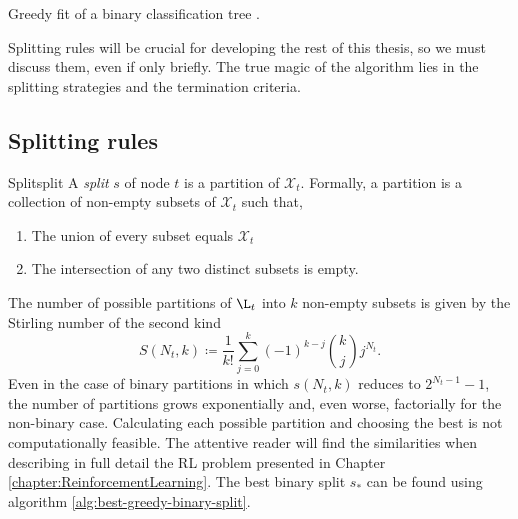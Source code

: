 \begin{algorithm}
    \caption[Greedy tree fitting algorithm]{Greedy fit of a binary
        classification tree \cite[Ch.~3.3]{louppe2014}.}
    \label{alg:tree-fit}
\end{algorithm}

Splitting rules will be crucial for developing the rest of this thesis, so we
must discuss them, even if only briefly. The true magic of the algorithm lies in
the splitting strategies and the termination criteria.

\subsection{Splitting rules}

\begin{dfn}{Split}{split}
    A \emph{split} $s$ of node $t$ is a partition of $\mathcal{X}_t$. Formally, a partition is a collection of non-empty subsets of $\mathcal{X}_t$ such that,
    \begin{enumerate}
        \item The union of every subset equals $\mathcal{X}_t$
        \item The intersection of any two distinct subsets is empty.
    \end{enumerate}
\end{dfn}

The number of possible partitions of $\L_t$ into $k$ non-empty subsets is given
by the Stirling number of the second kind \cite{louppe2014}
\[
    S(N_t, k) \coloneqq \frac{1}{k!} \sum_{j=0}^{k} (-1)^{k-j} \binom{k}{j} j^{N_t}.
\]
Even in the case of binary partitions in which $s(N_t, k)$ reduces to $2^{N_t
-1}-1$, the number of partitions grows exponentially and, even worse,
factorially for the non-binary case. Calculating each possible partition and
choosing the best is not computationally feasible. The attentive reader will
find the similarities when describing in full detail the RL problem presented in
Chapter \ref{chapter:ReinforcementLearning}. The best binary split $s_*$ can be
found using algorithm \ref{alg:best-greedy-binary-split}.

